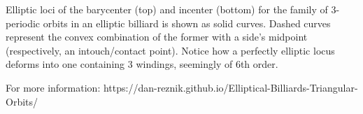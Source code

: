 Elliptic loci of the barycenter (top) and incenter (bottom) for the family of 3-periodic orbits in an elliptic billiard is shown as solid curves. Dashed curves represent the convex combination of the former with a side's midpoint (respectively, an intouch/contact point). Notice how a perfectly elliptic locus deforms into one containing 3 windings, seemingly of 6th order.

For more information: https://dan-reznik.github.io/Elliptical-Billiards-Triangular-Orbits/